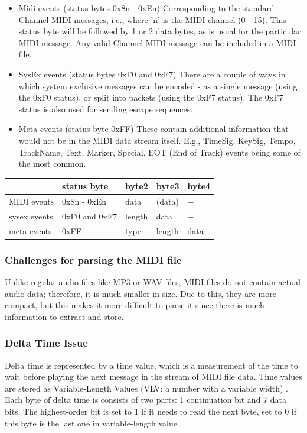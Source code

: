 \documentclass[runningheads]{llncs}
\begin{document}
\begin{itemize}
 \item Midi events (status bytes 0x8n - 0xEn)
Corresponding to the standard Channel MIDI messages, i.e., where 'n' is the MIDI channel (0 - 15). This status byte will be followed by 1 or 2 data bytes, as is usual for the particular MIDI message. Any valid Channel MIDI message can be included in a MIDI file.

 \item SysEx events (status bytes 0xF0 and 0xF7)
There are a couple of ways in which system exclusive messages can be encoded - as a single message (using the 0xF0 status), or split into packets (using the 0xF7 status). The 0xF7 status is also used for sending escape sequences.

 \item Meta events (status byte 0xFF) \label{MetaEvents}
These contain additional information that would not be in the MIDI data stream itself. E.g., TimeSig, KeySig, Tempo, TrackName, Text, Marker, Special, EOT (End of Track) events being some of the most common.
\end{itemize}
\renewcommand{\arraystretch}{1.0}
\begin{center}
	\begin{tabu}{|l|m{7em}|m{4em}|m{4em}|m{4em}|}
	    \hline
	    & status byte & byte2 & byte3 & byte4 \\
        \hline
		MIDI events & 0x8n - 0xEn & data & (data) & $-$\\ 
		\hline
		sysex events & 0xF0 and 0xF7 & length & data & $-$\\  
		\hline
		meta events & 0xFF & type & length & data \\  
		\hline
	\end{tabu}
\end{center}

\subsubsection{Challenges for parsing the MIDI file}
Unlike regular audio files like MP3 or WAV files, MIDI files do not contain actual audio data; therefore, it is much smaller in size. Due to this, they are more compact, but this makes it more difficult to parse it since there is much information to extract and store.
\subsubsection{Delta Time Issue}
Delta time is represented by a time value, which is a measurement of the time to wait before playing the next message in the stream of MIDI file data. Time values are stored as Variable-Length Values (VLV: a number with a variable width) \cite{vlv}. Each byte of delta time is consists of two parts: 1 continuation bit and 7 data bits. The highest-order bit is set to 1 if it needs to read the next byte, set to 0 if this byte is the last one in variable-length value.
\end{document}
